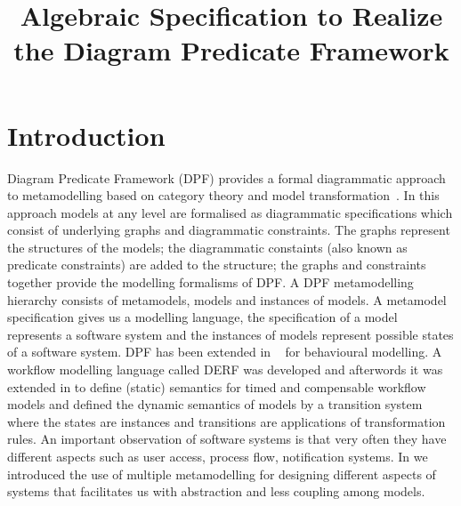 \documentclass{eceasst}
\title{Algebraic Specification to Realize the Diagram Predicate Framework} %
\begin{document}
\maketitle

\section{Introduction}
Diagram Predicate Framework (DPF) provides a formal diagrammatic approach to metamodelling based on category theory and model transformation~\cite{Rutle10}. 
In this approach models at any level are formalised as diagrammatic specifications which consist of underlying graphs and diagrammatic constraints. 
The graphs represent the structures of the models; the diagrammatic constaints (also known as predicate constraints) are added to the structure; 
the graphs and constraints together provide the modelling formalisms of DPF. 
A DPF metamodelling hierarchy consists of metamodels, models and instances of models. 
A metamodel specification gives us a modelling language, the specification of a model represents a software system and the instances of models represent possible states of a software system. 
DPF has been extended in ~\cite{RutleMacCaullEtAl2012ECMFA,RutleWMFHIES12} for behavioural modelling. 
A workflow modelling language called DERF was developed and afterwords it was extended in \cite{WangRutleEtAl2012TASE} to define (static) semantics for timed and compensable workflow models and 
defined the dynamic semantics of models by a transition system where the states are instances and transitions are applications of transformation rules. 
An important observation of software systems is that very often they have different aspects such as user access, process flow, notification systems. 
In \cite{PAHI14} we introduced the use of multiple metamodelling for designing different aspects of systems that facilitates us with abstraction and less coupling among models. 
\end{document}
